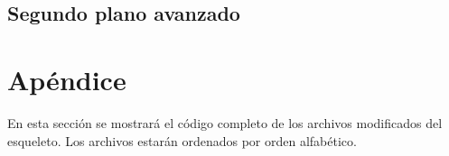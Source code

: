 \documentclass[a4paper, 12pt]{article}
\begin{document}
		\subsection{Segundo plano avanzado}
		
	
		
	\newpage
	\section{Apéndice}
	En esta sección se mostrará el código completo de los archivos modificados del esqueleto. Los archivos estarán ordenados por orden alfabético.\\
	
	
	\bigskip\bigskip\bigskip
	
	
	
			
\end{document}
